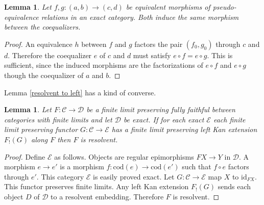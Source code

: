\documentclass[sort&compress,draft]{elsarticle}
\theoremstyle{plain}
\newtheorem{lemma}[theorem]{Lemma}
\theoremstyle{definition}
\theoremstyle{remark}
\newcommand\hide[1]{}
\newcommand\cat\mathcal
\newcommand\of:
\newcommand\id{\mathrm{id}}
\newcommand\cod{\mathrm{cod}}
\newcommand\di{_!}
\begin{document}
\begin{lemma} Let $f,g\of(a,b)\to(c,d)$ be equivalent morphisms of pseudo-e\-qui\-va\-len\-ce relations in an exact category. Both induce the same morphism between the coequalizers. \label{equivalence implies equality} \end{lemma}

\begin{proof} An equivalence $h$ between $f$ and $g$ factors the pair $(f_0,g_0)$ through $c$ and $d$. Therefore the coequalizer $e$ of $c$ and $d$ must satisfy $e\circ f=e\circ g$. This is sufficient, since the induced morphisms are the factorizations of $e \circ f$ and $e\circ g$ though the coequalizer of $a$ and $b$.
\end{proof}

Lemma \ref{resolvent to left} has a kind of converse.

\begin{lemma} Let $F\of\cat C\to\cat D$ be a finite limit preserving fully faithful between categories with finite limits and let $\cat D$ be exact. If for each exact $\cat E$ each finite limit preserving functor $G\of\cat C\to\cat E$ has a finite limit preserving left Kan extension $F\di(G)$ along $F$ then $F$ is resolvent. \label{left to resolvent}\end{lemma}

\begin{proof} Define $\cat E$ as follows. Objects are regular epimorphisms $FX\to Y$ in $\cat D$. A morphism $e\to e'$ is a morphism $f\of\cod(e)\to\cod(e')$
such that $f\circ e$ factors through $e'$. This category $\cat E$ is easily proved exact. Let $G\of \cat C\to\cat E$ map $X$ to $\id_{FX}$. This functor preserves finite limits. Any left Kan extension $F\di(G)$ sends each object $D$ of $\cat D$ to a resolvent embedding. Therefore $F$ is resolvent.
\end{proof}

\hide{ The intuition is equational and essentially algebraic logic. Finite limit preserving functors preserve these.}
\end{document}
